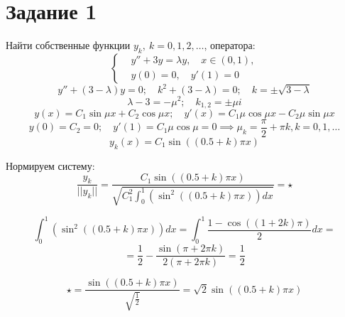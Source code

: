 \section*{Задание 1}
    Найти собственные функции $y_k, ~ k = 0, 1, 2, \dots$, оператора: 
    \[
        \left\{
            \begin{aligned}
                & y'' + 3y = \lambda y, \quad x \in (0, 1), \\
                & y(0) = 0,\quad y'(1) = 0
            \end{aligned}
        \right.
    \]
    \[ y'' + (3-\lambda) y = 0; \quad k^2 + (3-\lambda) = 0; \quad k = \pm \sqrt{3 - \lambda} \]
    \[ \lambda - 3 = -\mu^2; \quad k_{1,2} = \pm \mu i \]
    \[ 
        y(x) = C_1 \sin \mu x + C_2 \cos \mu x; \quad y'(x) = C_1 \mu \cos \mu x - C_2 \mu \sin \mu x 
    \]
    \[ y(0) = C_2 = 0; \quad y'(1) = C_1 \mu \cos \mu = 0 \implies \mu_k = \frac{\pi}{2} + \pi k, k = 0, 1, \dots \]
    \[ y_k(x) = C_1 \sin \left( (0.5 + k) \pi x \right) \]

    Нормируем систему:
    \[ \frac{y_k}{||y_k||} = \frac{C_1 \sin \left( (0.5 + k) \pi x \right) }{ \sqrt{ C_1^2 \int_0^1 \left( \sin^2 \left( (0.5 + k) \pi x \right) \right) dx }} = \star \]

    \[ \int_0^1 \left( \sin^2 \left( (0.5 + k) \pi x \right) \right)dx = \int_0^1 \frac{1 - \cos\left((1 + 2k)\pi \right)}{2}dx = \]
    \[ = \frac{1}{2} - \frac{\sin(\pi + 2 \pi k)}{2(\pi + 2 \pi k)} = \frac{1}{2} \]

    \[ \star = \frac{ \sin \left( (0.5 + k) \pi x \right) }{ \sqrt{ \frac{1}{2} } } = \sqrt{2} \sin \left( (0.5 + k) \pi x \right) \]